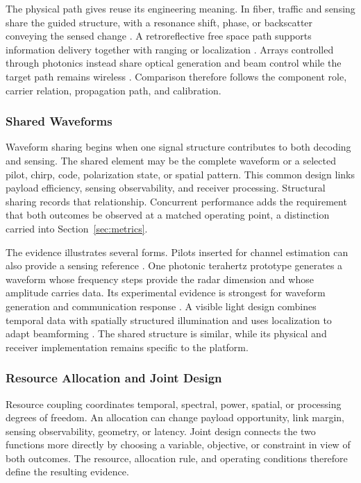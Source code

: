 The physical path gives reuse its engineering meaning. In fiber, traffic and
sensing share the guided structure, with a resonance shift, phase, or
backscatter conveying the sensed change
\cite{OISAC_SCR00002,OISAC_SCR00013}. A retroreflective free space
path supports information delivery together with ranging or localization
\cite{OISAC_SCR00011}. Arrays controlled through photonics instead share
optical generation and beam control while the target path remains wireless
\cite{OISAC_SCR00036}. Comparison therefore follows the component role, carrier
relation, propagation path, and calibration.

\subsubsection{Shared Waveforms}

Waveform sharing begins when one signal structure contributes to both decoding
and sensing. The shared element may be the complete waveform or a selected
pilot, chirp, code, polarization state, or spatial pattern. This common design
links payload efficiency, sensing observability, and receiver processing.
Structural sharing records that relationship. Concurrent performance adds the
requirement that both outcomes be observed at a matched operating point, a
distinction carried into Section~\ref{sec:metrics}.

The evidence illustrates several forms. Pilots inserted for channel estimation
can also provide a sensing reference \cite{OISAC_SCR00007}. One photonic
terahertz prototype generates a waveform whose frequency steps provide the
radar dimension and whose amplitude carries data. Its experimental evidence is
strongest for waveform generation and communication response
\cite{OISAC_SCR00160}. A visible light design combines temporal data with
spatially structured illumination and uses localization to adapt beamforming
\cite{OISAC_SCR00196}. The shared structure is similar, while its physical and
receiver implementation remains specific to the platform.

\subsubsection{Resource Allocation and Joint Design}

Resource coupling coordinates temporal, spectral, power, spatial, or processing
degrees of freedom. An allocation can change payload opportunity, link margin,
sensing observability, geometry, or latency. Joint design connects the two
functions more directly by choosing a variable, objective, or constraint in
view of both outcomes. The resource, allocation rule, and operating conditions
therefore define the resulting evidence.

